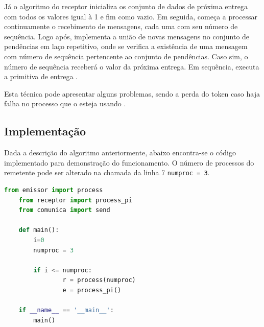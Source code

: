 \documentclass[10pt,conference]{IEEEtran}
\begin{document}
Já o algoritmo do receptor inicializa os conjunto de dados de próxima entrega com todos os valores igual à 1 e fim como vazio. Em seguida, começa a processar continuamente o recebimento de mensagens, cada uma com seu número de sequência. Logo após, implementa a união de novas mensagens no conjunto de pendências em laço repetitivo, onde se verifica a existência de uma mensagem com número de sequência pertencente ao conjunto de pendências. Caso sim, o número de sequência receberá o valor da próxima entrega. Em sequência, executa a primitiva de entrega \cite{defago2000totally}.    

Esta técnica pode apresentar alguns problemas, sendo a perda do token caso haja falha no processo que o esteja usando \cite{compdistlau}.

\subsection{Implementação}
Dada a descrição do algoritmo anteriormente, abaixo encontra-se o código implementado para demonstração do funcionamento. O número de processos do remetente pode ser alterado na chamada da linha 7 \verb|numproc = 3|.

\begin{lstlisting}[language=Python, caption=Código main]
    from emissor import process
    from receptor import process_pi
    from comunica import send
    
    def main():
        i=0
        numproc = 3
        
        if i <= numproc:
                r = process(numproc)
                e = process_pi()

    if __name__ == '__main__':
        main()
\end{lstlisting}
\end{document}
